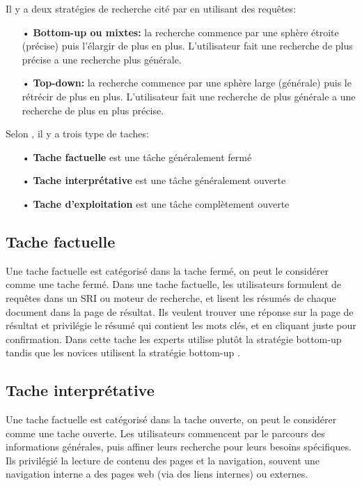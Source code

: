 Il y a deux stratégies de recherche cité par \citeauthor{ir-on-web} \citep{ir-on-web} en utilisant des requêtes:
\begin{itemize}
    \item[•] \textbf{Bottom-up ou mixtes:} la recherche commence par une sphère étroite (précise) puis l’élargir de plus en plus. L'utilisateur fait une recherche de plus précise a une recherche plus générale.
    \item[•] \textbf{Top-down:} la recherche commence par une sphère large (générale) puis le rétrécir de plus en plus. L'utilisateur fait une recherche de plus générale a une recherche de plus en plus précise.
\end{itemize}

Selon \citeauthor{ri-sur-le-web} \citep{ri-sur-le-web}, il y a trois type de taches:
\begin{itemize}
    \item[•] \textbf{Tache factuelle} est une tâche généralement fermé
    \item[•] \textbf{Tache interprétative} est une tâche généralement ouverte
    \item[•] \textbf{Tache d'exploitation} est une tâche complètement ouverte
\end{itemize}

\subsection{Tache factuelle}
Une tache factuelle est catégorisé dans la tache fermé, on peut le considérer comme une tache fermé. Dans une tache factuelle, les utilisateurs formulent de requêtes dans un SRI ou moteur de recherche, et lisent les résumés de chaque document dans la page de résultat. Ils veulent trouver une réponse sur la page de résultat et privilégie le résumé qui contient les mots clés, et en cliquant juste pour confirmation. Dans cette tache les experts utilise plutôt la stratégie bottom-up tandis que les novices utilisent la stratégie bottom-up \citep{ri-sur-le-web}.

\subsection{Tache interprétative}
Une tache factuelle est catégorisé dans la tache ouverte, on peut le considérer comme une tache ouverte. Les utilisateurs commencent par le parcours des informations générales, puis affiner leurs recherche pour leurs besoins spécifiques. Ils privilégié la lecture de contenu des pages et la navigation, souvent une navigation interne a des pages web (via des liens internes) ou externes.

